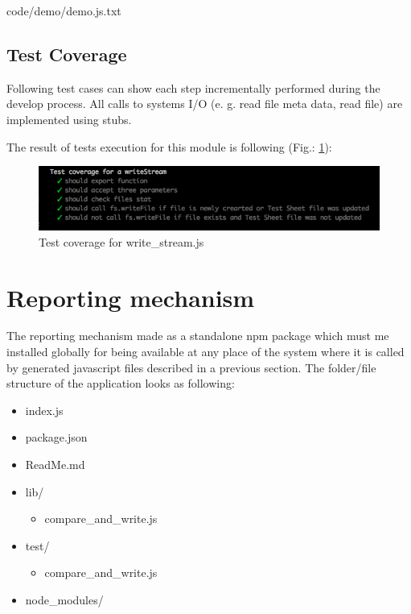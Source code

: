 
{code/demo/demo.js.txt}


%

\subsection{Test Coverage}
Following test cases can show each step incrementally performed during the develop process. All calls to systems I/O (e. g. read file meta data, read file) are implemented using stubs.
%


The result of tests execution  for this module is following (Fig.: \ref{fig:testWrite}): 
\begin{figure}[H]
	\centering
	\includegraphics[width=\linewidth]{grafiken/testWriteStream.png}
	\caption{Test coverage for write\_stream.js}
	\label{fig:testWrite}
\end{figure}

\section{Reporting mechanism}
The reporting mechanism made as a standalone npm package which must me installed globally for being available at any place of the system where it is called by generated javascript files described in a previous section. 
The folder/file structure of the application looks as following:
\begin{itemize}
	\item index.js
	\item package.json
	\item ReadMe.md
	\item lib/
	\begin{itemize}
		\item compare\_and\_write.js
	\end{itemize}
	\item test/
	\begin{itemize}
		\item compare\_and\_write.js
	\end{itemize}
	\item node\_modules/
\end{itemize}

